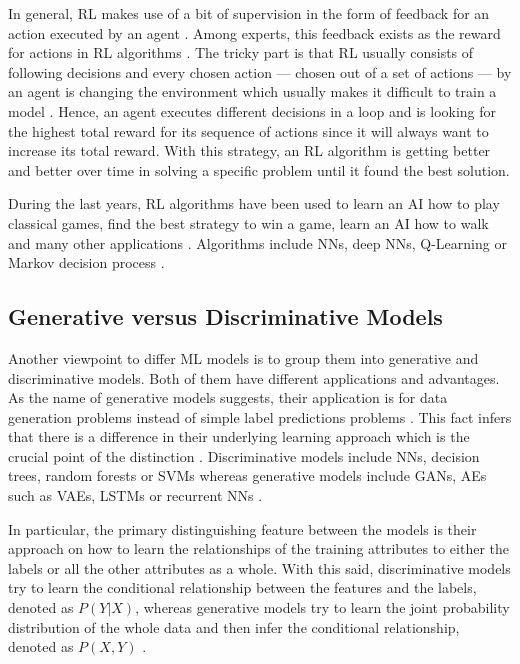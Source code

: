 \documentclass[MGS,Master,english]{twbook}%
\begin{document}
In general, \ac{RL} makes use of a bit of supervision in the form of feedback for an action executed by an agent \cite{ml::book::statistics}. Among experts, this feedback exists as the reward for actions in \ac{RL} algorithms \cite{ml::book::statistics}.  The tricky part is that \ac{RL} usually consists of following decisions and every chosen action — chosen out of a set of actions — by an agent is changing the environment which usually makes it difficult to train a model \cite{ml::book::statistics}. Hence, an agent executes different decisions in a loop and is looking for the highest total reward for its sequence of actions since it will always want to increase its total reward. \cite{ai::book} With this strategy, an \ac{RL} algorithm is getting better and better over time in solving a specific problem until it found the best solution.

During the last years, \ac{RL} algorithms have been used to learn an \ac{AI} how to play classical games, find the best strategy to win a game, learn an \ac{AI} how to walk and many other applications \cite{ml::book::algorithms}. Algorithms include \acp{NN}, deep \acp{NN}, Q-Learning or Markov decision process \cite{ml::book::statistics}.

\subsection{Generative versus Discriminative Models}
Another viewpoint to differ \ac{ML} models is to group them into generative and discriminative models. Both of them have different applications and advantages. As the name of generative models suggests, their application is for data generation problems instead of simple label predictions problems \cite{ml::book::nnProgrammingTF}. This fact infers that there is a difference in their underlying learning approach which is the crucial point of the distinction \cite{ml::book::nnProgrammingTF}. Discriminative models include \acp{NN}, decision trees, random forests or \acp{SVM} whereas generative models include \acp{GAN}, \acp{AE} such as \acp{VAE}, \acp{LSTM} or recurrent \acp{NN} \cite{ml::book::nnProgrammingTF}. 

In particular, the primary distinguishing feature between the models is their approach on how to learn the relationships of the training attributes to either the labels or all the other attributes as a whole. With this said, discriminative models try to learn the conditional relationship between the features and the labels, denoted as $P(Y|X)$, whereas generative models try to learn the joint probability distribution of the whole data and then infer the conditional relationship, denoted as $P(X,Y)$ \cite{ml::book::nnProgrammingTF}.
\end{document}
